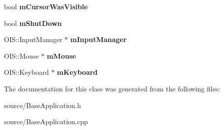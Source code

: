\begin{DoxyCompactItemize}
bool {\bfseries m\+Cursor\+Was\+Visible}
\item 
\mbox{\label{class_base_application_a755f26d3a9915aaf830750d877e39d86}} 
bool {\bfseries m\+Shut\+Down}
\item 
\mbox{\label{class_base_application_abc9503c8462e225b5d0d55c952d9e4a9}} 
O\+I\+S\+::\+Input\+Manager $\ast$ {\bfseries m\+Input\+Manager}
\item 
\mbox{\label{class_base_application_add9b97fbe64da2814d3af113bac58c43}} 
O\+I\+S\+::\+Mouse $\ast$ {\bfseries m\+Mouse}
\item 
\mbox{\label{class_base_application_a9d6e19cf50c47379fbaae55bff28079c}} 
O\+I\+S\+::\+Keyboard $\ast$ {\bfseries m\+Keyboard}
\end{DoxyCompactItemize}


The documentation for this class was generated from the following files\+:\begin{DoxyCompactItemize}
\item 
source/Base\+Application.\+h\item 
source/Base\+Application.\+cpp\end{DoxyCompactItemize}

